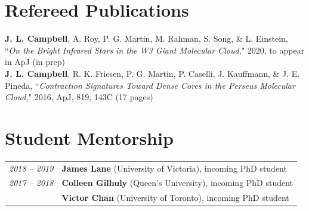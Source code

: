 \documentclass[10pt]{res} %
\begin{document}
\begin{resume}
\section{\Large Refereed Publications}
\vspace{-5pt} %
\noindent\makebox[\linewidth]{\rule{\textwidth}{0.4pt}}
\vspace{-20pt} %

\textbf{J. L. Campbell}, A. Roy, P. G. Martin, M. Rahman, S. Song, \& L. Einstein, ``\textit{On the Bright Infrared Stars in the W3 Giant Molecular Cloud,}" 2020, to appear in ApJ (in prep) \\
\textbf{J. L. Campbell}, R. K. Friesen, P. G. Martin, P. Caselli, J. Kauffmann, \& J. E. Pineda, ``\textit{Contraction Signatures Toward Dense Cores in the Perseus Molecular Cloud,}" 2016, ApJ, 819, 143C (17 pages)


\newpage
\section{\Large Student Mentorship}
\vspace{-5pt} %
\noindent\makebox[\linewidth]{\rule{\textwidth}{0.4pt}}
\vspace{-20pt} %

\begin{table}[h!]
\begin{tabularx}{\textwidth}{lX}
\textit{2018 -- 2019} & \textbf{James Lane} (University of Victoria), incoming PhD student \\
\textit{2017 -- 2018} & \textbf{Colleen Gilhuly} (Queen's University), incoming PhD student \\
                                & \textbf{Victor Chan} (University of Toronto), incoming PhD student
\end{tabularx}
\end{table}


\end{resume}
\end{document}
